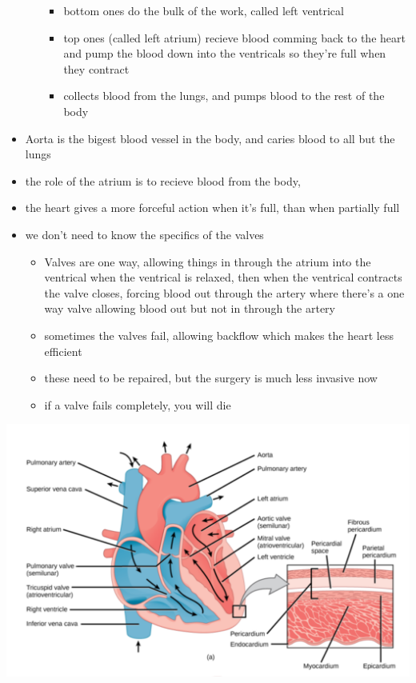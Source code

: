 \documentclass{article}
\theoremstyle{definition}
\begin{document}
\begin{itemize}
\begin{itemize}
\begin{itemize}
					\item bottom ones do the bulk of the work, called left ventrical
					\item top ones (called left atrium) recieve blood comming back to the heart and pump the blood down into the ventricals so they're full when they contract 
					\item collects blood from the lungs, and pumps blood to the rest of the body
				\end{itemize}
		\end{itemize}
	\item Aorta is the bigest blood vessel in the body, and caries blood to all but the lungs
	\item the role of the atrium is to recieve blood from the body, 
	\item the heart gives a more forceful action when it's full, than when partially full
	\item we don't need to know the specifics of the valves
		\begin{itemize}
			\item Valves are one way, allowing things in through the atrium into the ventrical when the ventrical is relaxed, then when the ventrical contracts the valve closes, forcing blood out through the artery where there's a one way valve allowing blood out but not in through the artery
			\item sometimes the valves fail, allowing backflow which makes the heart less efficient
			\item these need to be repaired, but the surgery is much less invasive now
			\item if a valve fails completely, you will die
		\end{itemize}
\end{itemize}
	\begin{center}
		\includegraphics[width=50em]{heart}
	\end{center}
\end{document}
